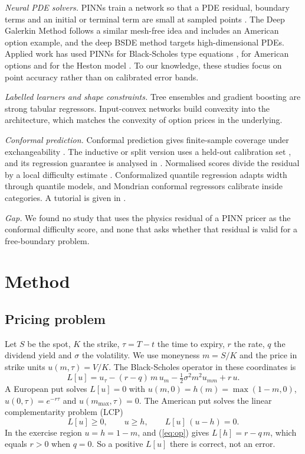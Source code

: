 \documentclass[conference]{IEEEtran}
\begin{document}
\emph{Neural PDE solvers.} PINNs train a network so that a PDE residual, boundary terms and an initial or terminal term are small at sampled points \cite{raissi2019physics}. The Deep Galerkin Method \cite{sirignano2018dgm} follows a similar mesh-free idea and includes an American option example, and the deep BSDE method \cite{han2018solving} targets high-dimensional PDEs. Applied work has used PINNs for Black-Scholes type equations \cite{bai2022application}, for American options \cite{gatta2023meshless} and for the Heston model \cite{hainaut2024option}. To our knowledge, these studies focus on point accuracy rather than on calibrated error bands.

\emph{Labelled learners and shape constraints.} Tree ensembles \cite{ho1995random,breiman2001random} and gradient boosting \cite{friedman2001greedy} are strong tabular regressors. Input-convex networks \cite{amos2017input} build convexity into the architecture, which matches the convexity of option prices in the underlying.

\emph{Conformal prediction.} Conformal prediction gives finite-sample coverage under exchangeability \cite{vovk2005algorithmic}. The inductive or split version uses a held-out calibration set \cite{papadopoulos2002inductive}, and its regression guarantee is analysed in \cite{lei2018distribution}. Normalised scores divide the residual by a local difficulty estimate \cite{papadopoulos2011regression}. Conformalized quantile regression \cite{romano2019conformalized} adapts width through quantile models, and Mondrian conformal regressors \cite{bostrom2020mondrian} calibrate inside categories. A tutorial is given in \cite{angelopoulos2023conformal}.

\emph{Gap.} We found no study that uses the physics residual of a PINN pricer as the conformal difficulty score, and none that asks whether that residual is valid for a free-boundary problem.

\section{Method}
\subsection{Pricing problem}
Let $S$ be the spot, $K$ the strike, $\tau=T-t$ the time to expiry, $r$ the rate, $q$ the dividend yield and $\sigma$ the volatility. We use moneyness $m=S/K$ and the price in strike units $u(m,\tau)=V/K$. The Black-Scholes operator \cite{black1973pricing,merton1973theory} in these coordinates is
\begin{equation}
L[u]=u_\tau-(r-q)\,m\,u_m-\tfrac12\sigma^2m^2u_{mm}+r\,u. \label{eq:op}
\end{equation}
A European put solves $L[u]=0$ with $u(m,0)=h(m)=\max(1-m,0)$, $u(0,\tau)=e^{-r\tau}$ and $u(m_{\max},\tau)=0$. The American put solves the linear complementarity problem (LCP)
\begin{equation}
L[u]\ge0,\qquad u\ge h,\qquad L[u]\,(u-h)=0. \label{eq:lcp}
\end{equation}
In the exercise region $u=h=1-m$, and (\ref{eq:op}) gives $L[h]=r-q\,m$, which equals $r>0$ when $q=0$. So a positive $L[u]$ there is correct, not an error.
\end{document}
